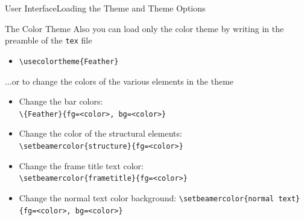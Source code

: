 \documentclass[aspectratio=169,10pt,xcolor={dvipsnames}]{beamer}
\begin{document}
\begin{frame}{User Interface}{Loading the Theme and Theme Options}

  \begin{block}{The Color Theme}
    Also you can load only the color theme by writing in the preamble of the {\tt tex} file 
    
    \vspace{5pt} 
    
    \begin{itemize}
    \item {\tt \textbackslash usecolortheme\{Feather\}}
    \end{itemize}
    
    \vspace{5pt}
    
    ...or to change the colors of the various elements in the theme
    
    \vspace{5pt} 
    \begin{itemize}
    \item Change the bar colors: \\    
    {\tt \textbackslash \{Feather\}\{fg=<color>, bg=<color>\}}
    
    \vspace{2pt} 
    
    \item Change the color of the structural elements: \\    
    {\tt \textbackslash setbeamercolor\{structure\}\{fg=<color>\}}
    
    \vspace{2pt} 
    
    \item Change the frame title text color:\\
    {\tt \textbackslash setbeamercolor\{frametitle\}\{fg=<color>\}}
    
    \vspace{2pt} 
    
    \item Change the normal text color background:    
    {\tt \textbackslash setbeamercolor\{normal text\}\{fg=<color>, bg=<color>\}}
    \end{itemize}
  \end{block}
\end{frame}


\end{document}
